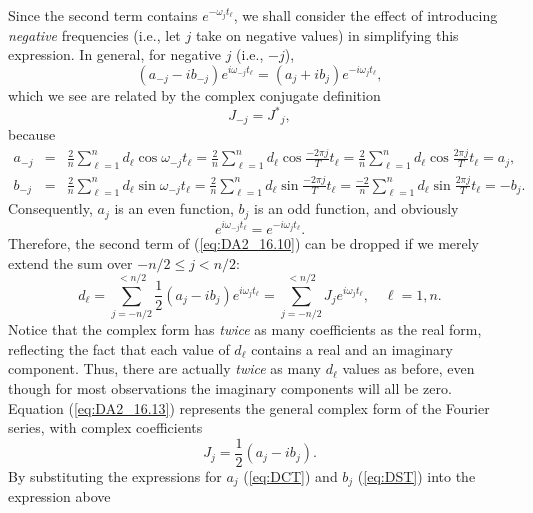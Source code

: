 Since the second term contains $e^{-\omega_j t_{\ell}}$, we shall consider the effect of introducing \emph{negative}
frequencies (i.e., let $j$ take on negative values) in simplifying this expression. In general, for negative $j$ (i.e., $-j$),
\begin{equation}
\left (a_{-j} - ib_{-j}\right )e^{i\omega_{-j} t_{\ell}} = \left (a_j +ib_j \right ) e^{-i \omega_j t_{\ell}},
\end{equation}
which we see are related by the complex conjugate definition
\begin{equation}
J_{-j} = {J^*}_j,
\end{equation}
because
$$
\begin{array} {rcl}
a_{-j} &=& \displaystyle \frac{2}{n} \sum^n_{\ell=1} d_{\ell} \cos \omega_{-j} t_{\ell} =\frac {2}{n} \sum^n_{\ell=1} d_{\ell} \cos \frac{-2 \pi j}{T}t_{\ell} = \frac{2}{n} \sum^n_{\ell=1} d_{\ell} \cos \frac{2\pi j}{T}t_{\ell} = a_j,\\[14pt]
b_{-j} &=& \displaystyle \frac{2}{n} \sum^{n}_{\ell=1} d_{\ell} \sin \omega_{-j} t_{\ell} = \frac {2}{n} \sum^n_{\ell=1} d_{\ell} \sin \frac {-2 \pi j}{T} t_{\ell} = \frac{-2}{n} \sum^n_{\ell=1} d_{\ell} \sin \frac{2 \pi j}{T} t_{\ell} = -b_j.
\end{array}
$$
Consequently, $a_j$ is an even function, $b_j$ is an odd function, and obviously
$$
e^{i \omega_{-j} t_{\ell}} = e^ {-i\omega_j t_{\ell}}.
$$
Therefore, the second term of (\ref{eq:DA2_16.10}) can be dropped if we merely extend the sum over
$-n/2 \leq j < n/2$:
\begin{equation}
\boxed{d_{\ell} = \sum^{< n/2}_{j = -n/2} \frac{1}{2} (a_j - ib_j) e^{i\omega_j t_{\ell}}= \sum^{< n/2}_{j = -n/2} J_j e^{i \omega_j t_{\ell}},\quad \ell=1,n.}
\label{eq:DA2_16.13}
\end{equation}
Notice that the complex form has \emph{twice} as many coefficients as the real form, reflecting the fact
that each value of $d_{\ell}$ contains a real and an imaginary component.  Thus, there are actually \emph{twice} as many $d_{\ell}$
values as before, even though for most observations the imaginary components will all be zero.
Equation (\ref{eq:DA2_16.13}) represents the general complex form of the Fourier series, with complex coefficients
\begin{equation}
J_j = \frac{1}{2} (a_j-ib_j).
\end{equation}
By substituting the expressions for $a_j$ (\ref{eq:DCT}) and $b_j$ (\ref{eq:DST}) into the expression above
